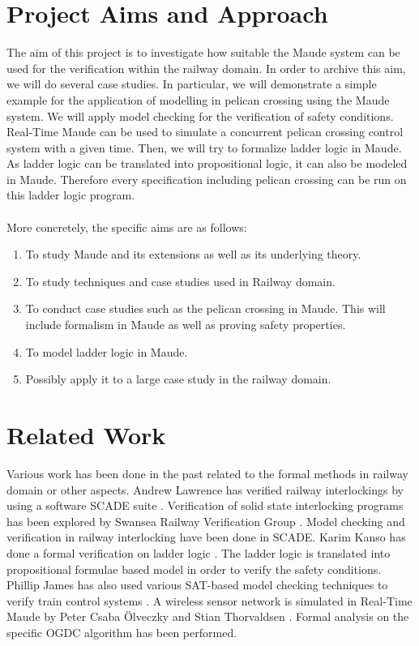 \documentclass[a4paper,11pt]{report}
\begin{document}
\section{Project Aims and Approach}
The aim of this project is to investigate how suitable the Maude system can be used for the verification within the railway domain. In order to archive this aim, we will do several case studies. In particular, we will demonstrate a simple example for the application of modelling in pelican crossing using the Maude system. We will apply model checking for the verification of safety conditions. Real-Time Maude can be used to simulate a concurrent pelican crossing control system with a given time. Then, we will try to formalize ladder logic in Maude. As ladder logic can be translated into propositional logic, it can also be modeled in Maude. 
Therefore every specification including pelican crossing can be run on this ladder logic program.\\\\
More concretely, the specific aims are as follows:
\begin{enumerate}
\item To study Maude and its extensions as well as its underlying theory.
\item To study techniques and case studies used in Railway domain.
\item To conduct case studies such as the pelican crossing in Maude. This will include formalism in Maude as well as proving safety properties.
\item To model ladder logic in Maude. 
\item Possibly apply it to a large case study in the railway domain.
\end{enumerate}
\section{Related Work}
Various work has been done in the past related to the formal methods in railway domain or other aspects. Andrew Lawrence has verified railway interlockings by using a software SCADE suite \cite{mres}. Verification of solid state interlocking programs has been explored by Swansea Railway Verification Group \cite{james2014verification}. Model checking and verification in railway interlocking have been done in SCADE. Karim Kanso has done a formal verification on ladder logic \cite{kanso}. The ladder logic is translated into propositional formulae based model in order to verify the safety conditions. Phillip James has also used various SAT-based model checking techniques to verify train control systems \cite{sat}. A wireless sensor network is simulated in Real-Time Maude by Peter Csaba Ölveczky and Stian Thorvaldsen \cite{raey2}. Formal analysis on the specific OGDC algorithm has been performed. 
\end{document}
